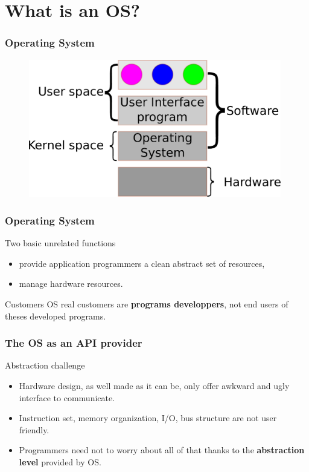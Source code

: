 \section{What is an OS?}
  \begin{frame}
    \frametitle{Operating System}
    \begin{figure}[t]
      \centering
      \includegraphics[height=6cm]{./imgs/os.pdf}
      \label{fig:os}
    \end{figure}
  \end{frame}

  \begin{frame}
    \frametitle{Operating System}
        \begin{block}{Two basic unrelated functions}
          \begin{itemize}
            \item provide application programmers a clean abstract set of resources,
            \item manage hardware resources.
          \end{itemize}
        \end{block}

        \begin{block}{Customers}
          OS real customers are \textbf{programs developpers}, not end users of theses developed programs.
        \end{block}
  \end{frame}

  \begin{frame}
    \frametitle{The OS as an API provider}
        \begin{block}{Abstraction challenge}
          \begin{itemize}
            \item Hardware design, as well made as it can be, only offer awkward and ugly interface to communicate.
            \item Instruction set, memory organization, I/O, bus structure are not user friendly.
            \item Programmers need not to worry about all of that thanks to the \textbf{abstraction level} provided by OS.
          \end{itemize}
        \end{block}
  \end{frame}

